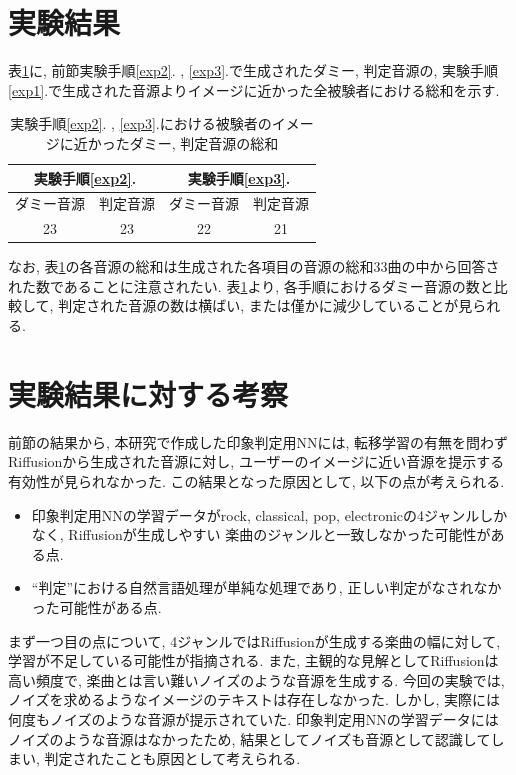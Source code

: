 \documentclass[a4paper,11pt,dvipdfmx]{jreport}
\begin{document}
\section{実験結果}
表\ref{table}に, 前節実験手順\ref{exp2}. , \ref{exp3}.で生成されたダミー, 判定音源の, 実験手順\ref{exp1}.で生成された音源よりイメージに近かった全被験者における総和を示す.

\begin{table}[htb]
  \caption{実験手順\ref{exp2}. , \ref{exp3}.における被験者のイメージに近かったダミー, 判定音源の総和}
    \label{table}
    \vspace{2mm}
    \begin{center}
        \begin{tabular}{|c|c|c|c|}
            \hline
            \multicolumn{2}{|c|}{実験手順\ref{exp2}.}&\multicolumn{2}{|c|}{実験手順\ref{exp3}.}\\
            \hline
            ダミー音源 & 判定音源 & ダミー音源 & 判定音源\\
            \hline
            23 & 23 & 22 & 21\\
            \hline
        \end{tabular}
        \end{center}
\end{table}

なお, 表\ref{table}の各音源の総和は生成された各項目の音源の総和33曲の中から回答された数であることに注意されたい.
表\ref{table}より, 各手順におけるダミー音源の数と比較して, 判定された音源の数は横ばい, または僅かに減少していることが見られる.

\section{実験結果に対する考察}
前節の結果から, 本研究で作成した印象判定用NNには, 転移学習の有無を問わずRiffusionから生成された音源に対し, ユーザーのイメージに近い音源を提示する有効性が見られなかった.
この結果となった原因として, 以下の点が考えられる.
\begin{itemize}
  \item 印象判定用NNの学習データがrock, classical, pop, 
        electronicの4ジャンルしかなく, Riffusionが生成しやすい
        楽曲のジャンルと一致しなかった可能性がある点.
  \item ``判定''における自然言語処理が単純な処理であり, 正しい判定がなされなかった可能性がある点.
\end{itemize}

まず一つ目の点について, 4ジャンルではRiffusionが生成する楽曲の幅に対して, 学習が不足している可能性が指摘される.
また, 主観的な見解としてRiffusionは高い頻度で, 楽曲とは言い難いノイズのような音源を生成する. 
今回の実験では, ノイズを求めるようなイメージのテキストは存在しなかった.
しかし, 実際には何度もノイズのような音源が提示されていた.
印象判定用NNの学習データにはノイズのような音源はなかったため, 結果としてノイズも音源として認識してしまい, 判定されたことも原因として考えられる.
\end{document}
